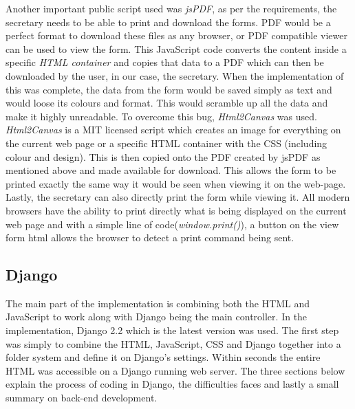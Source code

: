 \documentclass[../main.tex]{subfiles}
\begin{document}
Another important public script used was \textit{jsPDF}\cite{jsPDF}, as per the requirements, the secretary needs to be able to print and download the forms. PDF would be a perfect format to download these files as any browser, or PDF compatible viewer can be used to view the form. This JavaScript code converts the content inside a specific \textit{HTML container} and copies that data to a PDF which can then be downloaded by the user, in our case, the secretary. When the implementation of this was complete, the data from the form would be saved simply as text and would loose its colours and format. This would scramble up all the data and make it highly unreadable. To overcome this bug, \textit{Html2Canvas} was used. \\[4mm]

\textit{Html2Canvas}\cite{htmlcanvas} is a MIT licensed script which creates an image for everything on the current web page or a specific HTML container with the CSS (including colour and design). This is then copied onto the PDF created by jsPDF as mentioned above and made available for download. This allows the form to be printed exactly the same way it would be seen when viewing it on the web-page. \\[4mm]

Lastly, the secretary can also directly print the form while viewing it. All modern browsers have the ability to print directly what is being displayed on the current web page and with a simple line of code(\textit{window.print()}), a button on the view form html allows the browser to detect a print command being sent. 


\subsection{Django}
The main part of the implementation is combining both the HTML and JavaScript to work along with Django being the main controller. In the implementation, Django 2.2\cite{djangoLatest} which is the latest version was used. The first step was simply to combine the HTML, JavaScript, CSS and Django together into a folder system and define it on Django's settings. Within seconds the entire HTML was accessible on a Django running web server. The three sections below explain the process of coding in Django, the difficulties faces and lastly a small summary on back-end development. 
\end{document}
